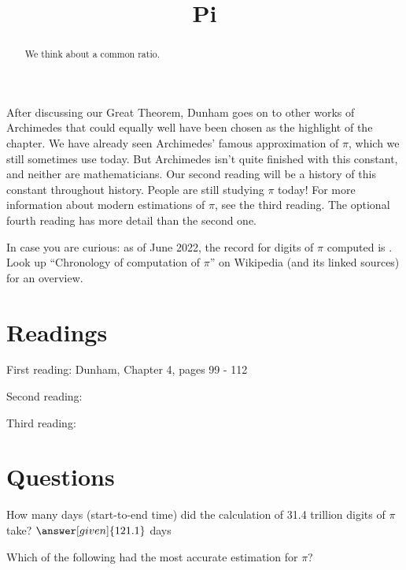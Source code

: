 \documentclass{ximera}
\title{Pi}
\begin{document}
\begin{abstract}
  We think about a common ratio.    
\end{abstract}
\maketitle

After discussing our Great Theorem, Dunham goes on to other works of Archimedes that could equally well have been chosen as the highlight of the chapter.   We have already seen Archimedes' famous approximation of $\pi$, which we still sometimes use today. But Archimedes isn't quite finished with this constant, and neither are mathematicians.  Our second reading will be a history of this constant throughout history.  People are still studying $\pi$ today!  For more information about modern estimations of $\pi$, see the third reading.  The optional fourth reading has more detail than the second one.

In case you are curious: as of June 2022, the record for digits of $\pi$ computed is .  Look up ``Chronology of computation of $\pi$'' on Wikipedia (and its linked sources) for an overview.


\section{Readings}
First reading: Dunham, Chapter 4, pages 99 - 112

Second reading: 

Third reading: 


\section{Questions}

\begin{question}
How many days (start-to-end time) did the calculation of 31.4 trillion digits of $\pi$ take? $\answer[given]{121.1}$ days
\end{question}

\begin{question}
Which of the following had the most accurate estimation for $\pi$?
\begin{multipleChoice}
\end{multipleChoice}
\end{question}
\end{document}
